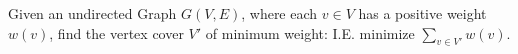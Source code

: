 \begin{defi}
\label{sub:mwvc}
Given an undirected Graph $G(V,E)$, where each $v \in V$ has a positive weight $w(v)$, find the vertex cover $V'$ of minimum weight: I.E. minimize $\sum_{v \in V'} w(v)$.
\end{defi}
